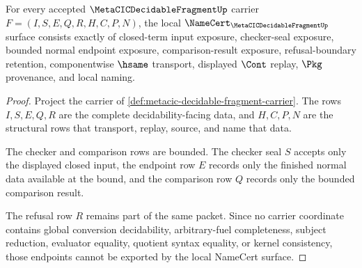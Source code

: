 \begin{theorem}
\label{thm:metacic-decidable-fragment-namecert-obligations}
For every accepted $\MetaCICDecidableFragmentUp$ carrier $F=(I,S,E,Q,R,H,C,P,N)$, the local $\NameCert_{\MetaCICDecidableFragmentUp}$ surface consists exactly of closed-term input exposure, checker-seal exposure, bounded normal endpoint exposure, comparison-result exposure, refusal-boundary retention, componentwise $\hsame$ transport, displayed $\Cont$ replay, $\Pkg$ provenance, and local naming.
\end{theorem}
\begin{proof}
Project the carrier of \autoref{def:metacic-decidable-fragment-carrier}. The rows $I,S,E,Q,R$ are the complete decidability-facing data, and $H,C,P,N$ are the structural rows that transport, replay, source, and name that data.

The checker and comparison rows are bounded. The checker seal $S$ accepts only the displayed closed input, the endpoint row $E$ records only the finished normal data available at the bound, and the comparison row $Q$ records only the bounded comparison result.

The refusal row $R$ remains part of the same packet. Since no carrier coordinate contains global conversion decidability, arbitrary-fuel completeness, subject reduction, evaluator equality, quotient syntax equality, or kernel consistency, those endpoints cannot be exported by the local NameCert surface.
\end{proof}

